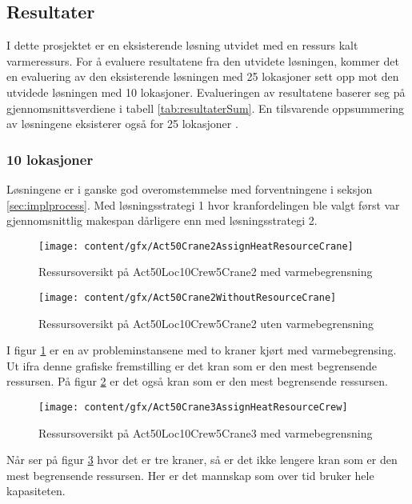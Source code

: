 \subsection{Resultater}
I dette prosjektet er en eksisterende løsning utvidet med en ressurs kalt varmeressurs. For å evaluere resultatene fra den utvidete løsningen, kommer det en evaluering av den eksisterende løsningen med 25 lokasjoner sett opp mot den utvidede løsningen med 10 lokasjoner. Evalueringen av resultatene baserer seg på gjennomsnittsverdiene i tabell \ref{tab:resultaterSum}. En tilsvarende oppsummering av løsningene eksisterer også for 25 lokasjoner \cite{tvedtbezem}.

\subsubsection{10 lokasjoner}
Løsningene er i ganske god overomstemmelse med forventningene i seksjon \ref{sec:implprocess}. Med løsningsstrategi 1 hvor kranfordelingen ble valgt først var gjennomsnittlig makespan dårligere enn med løsningsstrategi 2.

\begin{figure}[!h]
\centering
\texttt{[image: content/gfx/Act50Crane2AssignHeatResourceCrane]}
\caption{Ressursoversikt på Act50Loc10Crew5Crane2 med varmebegrensning}
\label{fig:RessursWithAct50Loc10Crew5Crane2}
\end{figure}
\begin{figure}[!h]
\centering
\texttt{[image: content/gfx/Act50Crane2WithoutResourceCrane]}
\caption{Ressursoversikt på Act50Loc10Crew5Crane2 uten varmebegrensning}
\label{fig:RessursWithoutAct50Loc10Crew5Crane2}
\end{figure}
I figur \ref{fig:RessursWithAct50Loc10Crew5Crane2} er en av probleminstansene med to kraner kjørt med varmebegrensing. Ut ifra denne grafiske fremstilling er det kran som er den mest begrensende ressursen. På figur \ref{fig:RessursWithoutAct50Loc10Crew5Crane2} er det også kran som er den mest begrensende ressursen.
\begin{figure}[!h]
\centering
\texttt{[image: content/gfx/Act50Crane3AssignHeatResourceCrew]}
\caption{Ressursoversikt på Act50Loc10Crew5Crane3 med varmebegrensning}
\label{fig:RessursWithAct50Loc10Crew5Crane3}
\end{figure}
Når ser på figur \ref{fig:RessursWithAct50Loc10Crew5Crane3} hvor det er tre kraner, så er det ikke lengere kran som er den mest begrensende ressursen. Her er det mannskap som over tid bruker hele kapasiteten.

